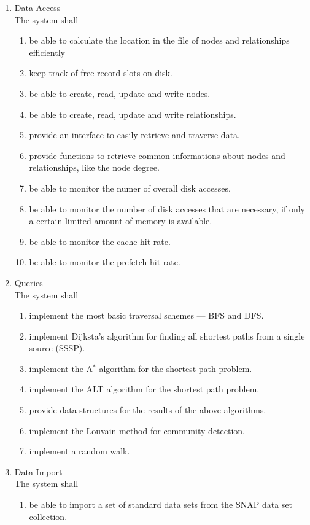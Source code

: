 \begin{enumerate}[label*=\arabic*]
\item Data Access \\
    The system shall
	\begin{enumerate}[label*=\arabic*]
    \item be able to calculate the location in the file of nodes and relationships efficiently
    \item keep track of free record slots on disk.
	\item be able to create, read, update and write nodes.
	\item be able to create, read, update and write relationships.
	\item provide an interface to easily retrieve and traverse data.
	\item provide functions to retrieve common informations about nodes and relationships, like the node degree.
	\item be able to monitor the numer of overall disk accesses.
	\item be able to monitor the number of disk accesses that are necessary, if only a certain limited amount of memory is available.
	\item be able to monitor the cache hit rate.
	\item be able to monitor the prefetch hit rate.
	\end{enumerate}

\item Queries \\
    The system shall
	\begin{enumerate}[label*=\arabic*]
	\item implement the most basic traversal schemes --- BFS and DFS.
	\item implement Dijksta's algorithm for finding all shortest paths from a single source (SSSP).
	\item implement the A$^*$ algorithm for the shortest path problem.
	\item implement the ALT algorithm for the shortest path problem.
	\item provide data structures for the results of the above algorithms.
	\item implement the Louvain method for community detection.
	\item implement a random walk.
	\end{enumerate}

\item Data Import \\
    The system shall
	\begin{enumerate}[label*=\arabic*]
	\item be able to import a set of standard data sets from the SNAP data set collection.
	\end{enumerate}
	

\end{enumerate}
